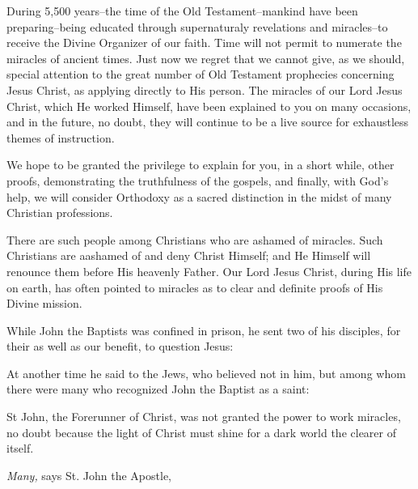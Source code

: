 During 5,500 years--the time of the Old Testament--mankind have been preparing--being educated through supernaturaly revelations and miracles--to receive the Divine Organizer of our faith. Time will not permit to numerate the miracles of ancient times. Just now we regret that we cannot give, as we should, special attention to the great number of Old Testament prophecies concerning Jesus Christ, as applying directly to His person. The miracles of our Lord Jesus Christ, which He worked Himself, have been explained to you on many occasions, and in the future, no doubt, they will continue to be a live source for exhaustless themes of instruction.

We hope to be granted the privilege to explain for you, in a short while, other proofs, demonstrating the truthfulness of the gospels, and finally, with God's help, we will consider Orthodoxy as a sacred distinction in the midst of many Christian professions.

There are such people among Christians who are ashamed of miracles. Such Christians are aashamed of and deny Christ Himself; and He Himself will renounce them before His heavenly Father. Our Lord Jesus Christ, during His life on earth, has often pointed to miracles as to clear and definite proofs of His Divine mission.

While John the Baptists was confined in prison, he sent two of his disciples, for their as well as our benefit, to question Jesus: 

At another time he said to the Jews, who believed not in him, but among whom there were many who recognized John the Baptist as a saint: 

St John, the Forerunner of Christ, was not granted the power to work miracles, no doubt because the light of Christ must shine for a dark world the clearer of itself.

\textit{Many,} says St. John the Apostle, 

